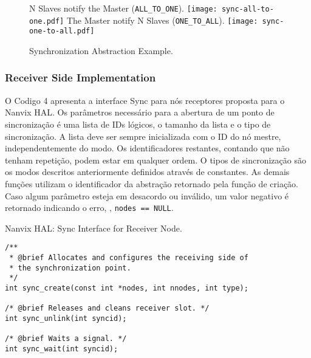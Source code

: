 			\begin{figure}[!tb]
				\centering%
				\caption{Synchronization Abstraction Example.}%
				\label{fig:sync-concepts}%

					{N Slaves notify the Master (\texttt{ALL\_TO\_ONE}).}%
					{\texttt{[image: sync-all-to-one.pdf]}}%
				\hfill
					{The Master notify N Slaves (\texttt{ONE\_TO\_ALL}).}%
					{\texttt{[image: sync-one-to-all.pdf]}}%

			\end{figure}

			\subsubsection{Receiver Side Implementation}

				O Codigo 4 apresenta a interface Sync para nós receptores proposta para o Nanvix HAL.
				Os parâmetros necessário para a abertura de um ponto de sincronização é uma lista de IDs lógicos, o tamanho da lista e o tipo de sincronização.
				A lista deve ser sempre inicializada com o ID do nó mestre, independentemente do modo.
				Os identificadores restantes, contando que não tenham repetição, podem estar em qualquer ordem.
				O tipos de sincronização são os modos descritos anteriormente definidos através de constantes.
				As demais funções utilizam o identificador da abstração retornado pela função de criação.
				Caso algum parâmetro esteja em desacordo ou inválido, um valor negativo é retornado indicando o erro, \eg, \texttt{nodes == NULL}.

\begin{listing}[!tb]
\caption{Nanvix HAL: Sync Interface for Receiver Node.}
\label{code:hal-sync-receiver}
\begin{verbatim}
/**
 * @brief Allocates and configures the receiving side of
 * the synchronization point.
 */
int sync_create(const int *nodes, int nnodes, int type);

/* @brief Releases and cleans receiver slot. */
int sync_unlink(int syncid);

/* @brief Waits a signal. */
int sync_wait(int syncid);
\end{verbatim}
\end{listing}

